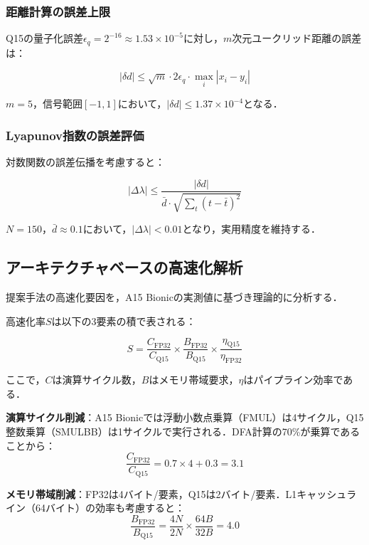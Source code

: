 \documentclass[paper]{ieice}
\begin{document}
\subsubsection{距離計算の誤差上限}
Q15の量子化誤差$\epsilon_q = 2^{-16} \approx 1.53 \times 10^{-5}$に対し，$m$次元ユークリッド距離の誤差は：

\begin{equation}
|\delta d| \leq \sqrt{m} \cdot 2\epsilon_q \cdot \max_i |x_i - y_i|
\end{equation}

$m=5$，信号範囲$[-1,1]$において，$|\delta d| \leq 1.37 \times 10^{-4}$となる．

\subsubsection{Lyapunov指数の誤差評価}
対数関数の誤差伝播を考慮すると：

\begin{equation}
|\Delta\lambda| \leq \frac{|\delta d|}{\bar{d} \cdot \sqrt{\sum_{t}(t - \bar{t})^2}}
\end{equation}

$N=150$，$\bar{d} \approx 0.1$において，$|\Delta\lambda| < 0.01$となり，実用精度を維持する．

\subsection{アーキテクチャベースの高速化解析}

提案手法の高速化要因を，A15 Bionicの実測値\cite{anandtech2021}に基づき理論的に分析する．

高速化率$S$は以下の3要素の積で表される：

\begin{equation}
S = \frac{C_{\text{FP32}}}{C_{\text{Q15}}} \times \frac{B_{\text{FP32}}}{B_{\text{Q15}}} \times \frac{\eta_{\text{Q15}}}{\eta_{\text{FP32}}}
\end{equation}

ここで，$C$は演算サイクル数，$B$はメモリ帯域要求，$\eta$はパイプライン効率である．

\textbf{演算サイクル削減}：A15 Bionicでは浮動小数点乗算（FMUL）は4サイクル，Q15整数乗算（SMULBB）は1サイクルで実行される\cite{arm2021}．DFA計算の70\%が乗算であることから：
\begin{equation}
\frac{C_{\text{FP32}}}{C_{\text{Q15}}} = 0.7 \times 4 + 0.3 = 3.1
\end{equation}

\textbf{メモリ帯域削減}：FP32は4バイト/要素，Q15は2バイト/要素．L1キャッシュライン（64バイト）の効率も考慮すると：
\begin{equation}
\frac{B_{\text{FP32}}}{B_{\text{Q15}}} = \frac{4N}{2N} \times \frac{64B}{32B} = 4.0
\end{equation}
\end{document}
